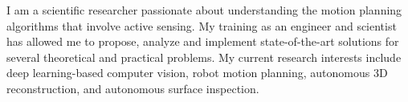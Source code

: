 I am a scientific researcher passionate about understanding the motion planning algorithms that involve active sensing. My training as an engineer and scientist has allowed me to propose, analyze and implement state-of-the-art solutions for several theoretical and practical problems. My current research interests include deep learning-based computer vision, robot motion planning, autonomous 3D reconstruction, and autonomous surface inspection.